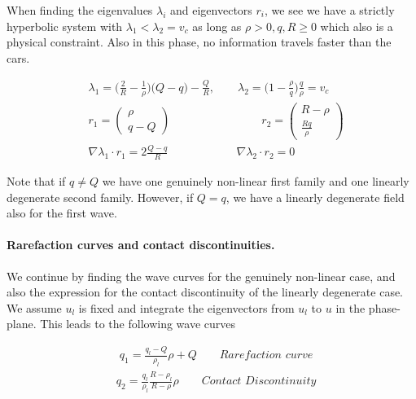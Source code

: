 \documentclass{article}
\numberwithin{equation}{section}
\begin{document}
When finding the eigenvalues $\lambda_i$ and eigenvectors $r_i$, we see we have a strictly hyperbolic system with $\lambda_1 < \lambda_2 = v_c$ as long as $\rho > 0, q, R \geq 0$ which also is a physical constraint. Also in this phase, no information travels faster than the cars. 

\begin{align}
    &\lambda_1 = \big ( \frac{2}{R} - \frac{1}{\rho} )\big (Q- q) - \frac{Q}{R}, \quad \quad \lambda_2 = \big(1 - \frac{\rho}{q}\big)\frac{q}{\rho} = v_c \\
    & r_1 = \begin{pmatrix} \rho \\ q - Q \end{pmatrix} \quad \quad \quad  \quad \quad \quad \quad \quad  r_2 = \begin{pmatrix} R - \rho \\ \frac{Rq}{\rho} \end{pmatrix} \\
    & \nabla \lambda_1 \cdot r_1 = 2\frac{Q-q}{R} \quad \quad \quad \quad \quad  \quad \nabla \lambda_2 \cdot r_2 = 0
    \label{EigenvaluesCongestedPhase} 
\end{align}

Note that if $q \neq Q$ we have one genuinely non-linear first family and one linearly degenerate second family. However, if $ Q = q$, we have a linearly degenerate field also for the first wave.

\paragraph{Rarefaction curves and contact discontinuities.}
We continue by finding the wave curves for the genuinely non-linear case, and also the expression for the contact discontinuity of the linearly degenerate case. We assume $u_l$ is fixed and integrate the eigenvectors from $u_l$ to $u$ in the phase-plane. This leads to the following wave curves

\begin{align}
    & q_1 = \frac{q_l - Q}{\rho_l} \rho + Q \quad \quad \textit{Rarefaction curve}
    \label{RarefactionWCongestedPh}
\end{align}
\begin{align}
    &  q_2 = \frac{q_l}{\rho_l} \frac{R - \rho_l}{R- \rho} \rho   \quad \quad \textit{Contact Discontinuity}
    \label{ContactDiscCongestedPh}
\end{align}
\end{document}
